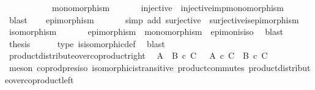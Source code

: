 \begin{isabellebody}
\ \ \ \ \isamarkupfalse%
\isanewline
\ \ \isamarkupfalse%
\isanewline
\isanewline
\ \ \isamarkupfalse%
\ {\isachardoublequoteopen}monomorphism\ {\isasymphi}{\isachardoublequoteclose}\isanewline
\ \ \ \ \isamarkupfalse%
\ {\isacartoucheopen}injective\ {\isasymphi}{\isacartoucheclose}\ injective{\isacharunderscore}{\kern0pt}imp{\isacharunderscore}{\kern0pt}monomorphism\ \isamarkupfalse%
\ blast\isanewline
\ \ \isamarkupfalse%
\ {\isachardoublequoteopen}epimorphism\ {\isasymphi}{\isachardoublequoteclose}\isanewline
\ \ \ \ \isamarkupfalse%
\ {\isacharparenleft}{\kern0pt}simp\ add{\isacharcolon}{\kern0pt}\ {\isacartoucheopen}surjective\ {\isasymphi}{\isacartoucheclose}\ surjective{\isacharunderscore}{\kern0pt}is{\isacharunderscore}{\kern0pt}epimorphism{\isacharparenright}{\kern0pt}\isanewline
\ \ \isamarkupfalse%
\ {\isachardoublequoteopen}isomorphism\ {\isasymphi}{\isachardoublequoteclose}\isanewline
\ \ \ \ \isamarkupfalse%
\ {\isacartoucheopen}epimorphism\ {\isasymphi}{\isacartoucheclose}\ {\isacartoucheopen}monomorphism\ {\isasymphi}{\isacartoucheclose}\ epi{\isacharunderscore}{\kern0pt}mon{\isacharunderscore}{\kern0pt}is{\isacharunderscore}{\kern0pt}iso\ \isamarkupfalse%
\ blast\isanewline
\ \ \isamarkupfalse%
\ \isamarkupfalse%
\ {\isacharquery}{\kern0pt}thesis\isanewline
\ \ \ \ \isamarkupfalse%
\ {\isasymphi}{\isacharunderscore}{\kern0pt}type\ is{\isacharunderscore}{\kern0pt}isomorphic{\isacharunderscore}{\kern0pt}def\ \isamarkupfalse%
\ blast\isanewline
{}\isamarkupfalse%
%
\endisatagproof
{\isafoldproof}%
%
\isadelimproof
\ \isanewline
%
\endisadelimproof
\isanewline
{}\isamarkupfalse%
\ product{\isacharunderscore}{\kern0pt}distribute{\isacharunderscore}{\kern0pt}over{\isacharunderscore}{\kern0pt}coproduct{\isacharunderscore}{\kern0pt}right{\isacharcolon}{\kern0pt}\isanewline
\ \ {\isachardoublequoteopen}{\isacharparenleft}{\kern0pt}A\ {\isasymCoprod}\ B{\isacharparenright}{\kern0pt}\ {\isasymtimes}\isactrlsub c\ C\ \ {\isasymcong}\ {\isacharparenleft}{\kern0pt}A\ {\isasymtimes}\isactrlsub c\ C{\isacharparenright}{\kern0pt}\ {\isasymCoprod}\ {\isacharparenleft}{\kern0pt}B\ {\isasymtimes}\isactrlsub c\ C{\isacharparenright}{\kern0pt}{\isachardoublequoteclose}\isanewline
%
\isadelimproof
\ \ %
\endisadelimproof
%
\isatagproof
{}\isamarkupfalse%
\ {\isacharparenleft}{\kern0pt}meson\ coprod{\isacharunderscore}{\kern0pt}pres{\isacharunderscore}{\kern0pt}iso\ isomorphic{\isacharunderscore}{\kern0pt}is{\isacharunderscore}{\kern0pt}transitive\ product{\isacharunderscore}{\kern0pt}commutes\ product{\isacharunderscore}{\kern0pt}distribute{\isacharunderscore}{\kern0pt}over{\isacharunderscore}{\kern0pt}coproduct{\isacharunderscore}{\kern0pt}left{\isacharparenright}{\kern0pt}%

\end{isabellebody}
